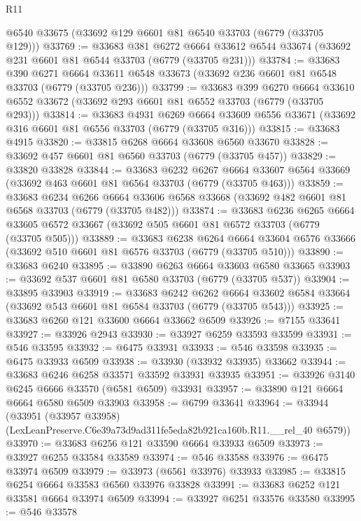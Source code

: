 \begin{lexlean}{R11}
\begin{coremodule}
    @6540
    @33675
    (@33692 @129 @6601 @81 @6540 @33703 (@6779 (@33705 @129)))
@33769 := @33683
    @381
    @6272
    @6664
    @33612
    @6544
    @33674
    (@33692 @231 @6601 @81 @6544 @33703 (@6779 (@33705 @231)))
@33784 := @33683
    @390
    @6271
    @6664
    @33611
    @6548
    @33673
    (@33692 @236 @6601 @81 @6548 @33703 (@6779 (@33705 @236)))
@33799 := @33683
    @399
    @6270
    @6664
    @33610
    @6552
    @33672
    (@33692 @293 @6601 @81 @6552 @33703 (@6779 (@33705 @293)))
@33814 := @33683
    @4931
    @6269
    @6664
    @33609
    @6556
    @33671
    (@33692 @316 @6601 @81 @6556 @33703 (@6779 (@33705 @316)))
@33815 := @33683 @4915
@33820 := @33815 @6268 @6664 @33608 @6560 @33670
@33828 := @33692 @457 @6601 @81 @6560 @33703 (@6779 (@33705 @457))
@33829 := @33820 @33828
@33844 := @33683
    @6232
    @6267
    @6664
    @33607
    @6564
    @33669
    (@33692 @463 @6601 @81 @6564 @33703 (@6779 (@33705 @463)))
@33859 := @33683
    @6234
    @6266
    @6664
    @33606
    @6568
    @33668
    (@33692 @482 @6601 @81 @6568 @33703 (@6779 (@33705 @482)))
@33874 := @33683
    @6236
    @6265
    @6664
    @33605
    @6572
    @33667
    (@33692 @505 @6601 @81 @6572 @33703 (@6779 (@33705 @505)))
@33889 := @33683
    @6238
    @6264
    @6664
    @33604
    @6576
    @33666
    (@33692 @510 @6601 @81 @6576 @33703 (@6779 (@33705 @510)))
@33890 := @33683 @6240
@33895 := @33890 @6263 @6664 @33603 @6580 @33665
@33903 := @33692 @537 @6601 @81 @6580 @33703 (@6779 (@33705 @537))
@33904 := @33895 @33903
@33919 := @33683
    @6242
    @6262
    @6664
    @33602
    @6584
    @33664
    (@33692 @543 @6601 @81 @6584 @33703 (@6779 (@33705 @543)))
@33925 := @33683 @6260 @121 @33600 @6664 @33662 @6509
@33926 := @7155 @33641
@33927 := @33926 @2943
@33930 := @33927 @6259 @33593 @33599
@33931 := @546 @33595
@33932 := @6475 @33931
@33933 := @546 @33598
@33935 := @6475 @33933 @6509
@33938 := @33930 (@33932 @33935) @33662
@33944 := @33683 @6246 @6258 @33571 @33592 @33931 @33935
@33951 := @33926 @3140 @6245 @6666 @33570 (@6581 @6509) @33931
@33957 := @33890 @121 @6664 @6664 @6580 @6509 @33903
@33958 := @6799 @33641
@33964 := @33944
    (@33951 (@33957 @33958) (LexLeanPreserve.C6e39a73d9ad311fe5eda82b921ca160b.R11.__rel_40 @6579))
@33970 := @33683 @6256 @121 @33590 @6664 @33933 @6509
@33973 := @33927 @6255 @33584 @33589
@33974 := @546 @33588
@33976 := @6475 @33974 @6509
@33979 := @33973 (@6561 @33976) @33933
@33985 := @33815 @6254 @6664 @33583 @6560 @33976 @33828
@33991 := @33683 @6252 @121 @33581 @6664 @33974 @6509
@33994 := @33927 @6251 @33576 @33580
@33995 := @546 @33578

\end{coremodule}
\end{lexlean}
